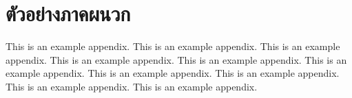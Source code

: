 \chapter{ตัวอย่างภาคผนวก}
\label{appA}

This is an example appendix. This is an example appendix. This is an example appendix. This is an example appendix. This is an example appendix. This is an example appendix. This is an example appendix. This is an example appendix. This is an example appendix. This is an example appendix.


